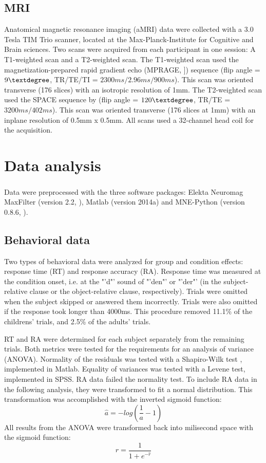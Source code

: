 \subsection {MRI}
Anatomical magnetic resonance imaging (aMRI) data were collected with a 3.0 Tesla TIM Trio scanner, located at the Max-Planck-Institute for Cognitive and Brain sciences.
Two scans were acquired from each participant in one session: A T1-weighted scan and a T2-weighted scan.
The T1-weighted scan used the magnetization-prepared rapid gradient echo (MPRAGE, \cite{3.2.mprage}]) sequence (flip angle = $9\textdegree$, TR/TE/TI = $2300ms/2.96ms/900ms$).
This scan was oriented transverse (176 slices) with an isotropic resolution of 1mm.
The T2-weighted scan used the SPACE sequence by \cite{3.2.space} (flip angle = $120\textdegree$, TR/TE = $3200ms/402ms$).
This scan was oriented transverse (176 slices at 1mm) with an inplane resolution of 0.5mm x 0.5mm.
All scans used a 32-channel head coil for the acquisition.


\section{Data analysis}

Data were preprocessed with the three software packages: Elekta Neuromag\textsuperscript{\textregistered} MaxFilter (version 2.2, \cite{3.3.MNE}), Matlab (version 2014a) and MNE-Python (version 0.8.6, \cite{3.3.MNEpython}).

\subsection{Behavioral data}

Two types of behavioral data were analyzed for group and condition effects: response time (RT) and response accuracy (RA).
Response time was measured at the condition onset, i.e. at the "'d"' sound of "'den"' or "'der"' (in the subject-relative clause or the object-relative clause, respectively).
Trials were omitted when the subject skipped or answered them incorrectly.
Trials were also omitted if the response took longer than 4000ms.
This procedure removed 11.1\% of the childrens' trials, and 2.5\% of the adults' trials.

RT and RA were determined for each subject separately from the remaining trials.
Both metrics were tested for the requirements for an analysis of variance (ANOVA).
Normality of the residuals was tested with a Shapiro-Wilk test \cite{3.3.swtest}, implemented in Matlab.
Equality of variances was tested with a Levene test\cite{3.3.levtest}, implemented in SPSS.
RA data failed the normality test.
To include RA data in the following analysis, they were transformed to fit a normal distribution.
This transformation was accomplished with the inverted sigmoid function:
\[ \hat{a} = - log( \frac{1}{a} - 1 ) \]
All results from the ANOVA were transformed back into milisecond space with the sigmoid function:
\[ r = \frac{1}{1+e^{-\hat{r}}} \]


